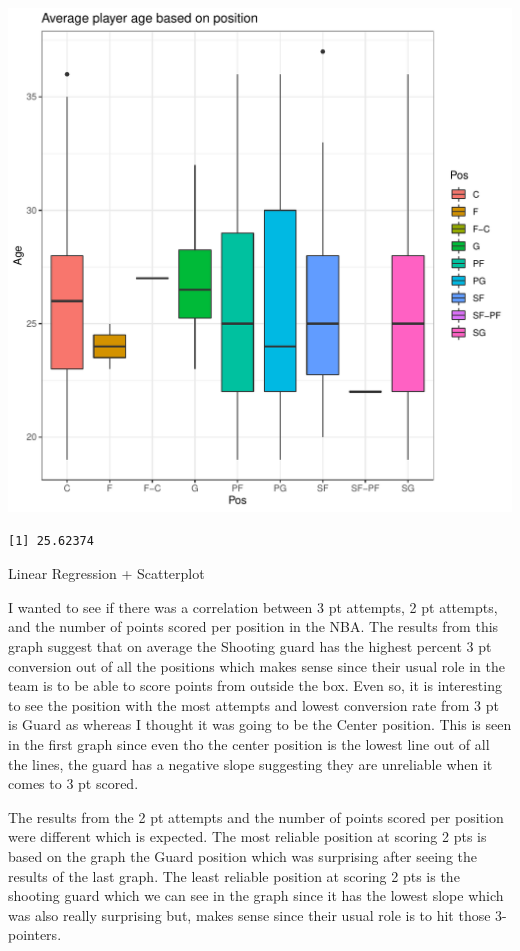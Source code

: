 \documentclass[
]{article}
\begin{document}
\begin{center}\includegraphics{./figures/unnamed-chunk-2-1} \end{center}

\begin{verbatim}
[1] 25.62374
\end{verbatim}

Linear Regression + Scatterplot

I wanted to see if there was a correlation between 3 pt attempts, 2 pt
attempts, and the number of points scored per position in the NBA. The
results from this graph suggest that on average the Shooting guard has
the highest percent 3 pt conversion out of all the positions which makes
sense since their usual role in the team is to be able to score points
from outside the box. Even so, it is interesting to see the position
with the most attempts and lowest conversion rate from 3 pt is Guard as
whereas I thought it was going to be the Center position. This is seen
in the first graph since even tho the center position is the lowest line
out of all the lines, the guard has a negative slope suggesting they are
unreliable when it comes to 3 pt scored.

The results from the 2 pt attempts and the number of points scored per
position were different which is expected. The most reliable position at
scoring 2 pts is based on the graph the Guard position which was
surprising after seeing the results of the last graph. The least
reliable position at scoring 2 pts is the shooting guard which we can
see in the graph since it has the lowest slope which was also really
surprising but, makes sense since their usual role is to hit those
3-pointers.
\end{document}
